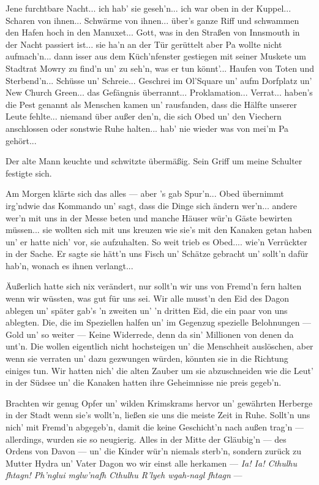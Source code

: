 \glqq Jene furchtbare Nacht... ich hab' sie geseh'n... ich war oben in der Kuppel... Scharen von ihnen... Schwärme von ihnen... über's ganze Riff und schwammen den Hafen hoch in den Manuxet... Gott, was in den Straßen von Innsmouth in der Nacht passiert ist... sie ha'n an der Tür gerüttelt aber Pa wollte nicht aufmach'n... dann isser aus dem Küch'nfenster gestiegen mit seiner Muskete um Stadtrat Mowry zu find'n un' zu seh'n, was er tun könnt'... Haufen von Toten und Sterbend'n... Schüsse un' Schreie... Geschrei im Ol'Square un' aufm Dorfplatz un' New Church Green... das Gefängnis überrannt... Proklamation... Verrat... haben's die Pest genannt als Menschen kamen un' rausfanden, dass die Hälfte unserer Leute fehlte... niemand über außer den'n, die sich Obed un' den Viechern anschlossen oder sonstwie Ruhe halten... hab' nie wieder was von mei'm Pa gehört...\grqq

Der alte Mann keuchte und schwitzte übermäßig. Sein Griff um meine Schulter festigte sich.

\glqq Am Morgen klärte sich das alles --- aber 's gab Spur'n... Obed übernimmt irg'ndwie das Kommando un' sagt, dass die Dinge sich ändern wer'n... andere wer'n mit uns in der Messe beten und manche Häuser wür'n Gäste bewirten müssen... sie wollten sich mit uns kreuzen wie sie's mit den Kanaken getan haben un' er hatte nich' vor, sie aufzuhalten. So weit trieb es Obed.... wie'n Verrückter in der Sache. Er sagte sie hätt'n uns Fisch un' Schätze gebracht un' sollt'n dafür hab'n, wonach es ihnen verlangt...

Äußerlich hatte sich nix verändert, nur sollt'n wir uns von Fremd'n fern halten wenn wir wüssten, was gut für uns sei. Wir alle musst'n den Eid des Dagon ablegen un' später gab's 'n zweiten un' 'n dritten Eid, die ein paar von uns ablegten. Die, die im Speziellen halfen un' im Gegenzug spezielle Belohnungen --- Gold un' so weiter --- Keine Widerrede, denn da sin' Millionen von denen da unt'n. Die wollen eigentlich nicht hochsteigen un' die Menschheit auslöschen, aber wenn sie verraten un' dazu gezwungen würden, könnten sie in die Richtung einiges tun. Wir hatten nich' die alten Zauber um sie abzuschneiden wie die Leut' in der Südsee un' die Kanaken hatten ihre Geheimnisse nie preis gegeb'n.

Brachten wir genug Opfer un' wilden Krimskrams hervor un' gewährten Herberge in der Stadt wenn sie's wollt'n, ließen sie uns die meiste Zeit in Ruhe. Sollt'n uns nich' mit Fremd'n abgegeb'n, damit die keine Geschicht'n nach außen trag'n --- allerdings, wurden sie so neugierig. Alles in der Mitte der Gläubig'n --- des Ordens von Davon --- un' die Kinder wür'n niemals sterb'n, sondern zurück zu Mutter Hydra un' Vater Dagon wo wir einst alle herkamen --- \textit{Ia! Ia! Cthulhu fhtagn! Ph’nglui mglw’nafh Cthulhu R’lyeh wgah-nagl fhtagn} ---
\grqq

